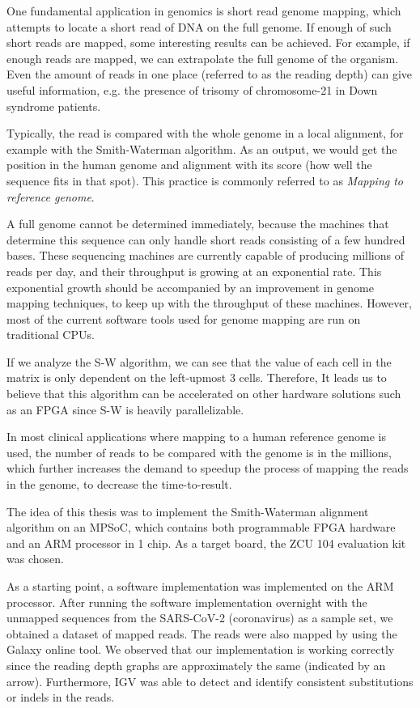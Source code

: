 One fundamental application in genomics is short read genome mapping, which attempts to locate a short read of DNA on the full genome. If enough of such short reads are mapped, some interesting results can be achieved. For example, if enough reads are mapped, we can extrapolate the full genome of the organism. Even the amount of reads in one place (referred to as the reading depth) can give useful information, e.g. the presence of trisomy of chromosome-21 in Down syndrome patients.

Typically, the read is compared with the whole genome in a local alignment, for example with the Smith-Waterman algorithm. As an output, we would get the position in the human genome and alignment with its score (how well the sequence fits in that spot). This practice is commonly referred to as \emph{Mapping to reference genome}.

A full genome cannot be determined immediately, because the machines that determine this sequence can only handle short reads consisting of a few hundred bases. These sequencing machines are currently capable of producing millions of reads per day, and their throughput is growing at an exponential rate. This exponential growth should be accompanied by an improvement in genome mapping techniques, to keep up with the throughput of these machines. However, most of the current software tools used for genome mapping are run on traditional CPUs. 

If we analyze the S-W algorithm, we can see that the value of each cell in the matrix is only dependent on the left-upmost 3 cells. Therefore, It leads us to believe that this algorithm can be accelerated on other hardware solutions such as an FPGA since S-W is heavily parallelizable.

In most clinical applications where mapping to a human reference genome is used, the number of reads to be compared with the genome is in the millions, which further increases the demand to speedup the process of mapping the reads in the genome, to decrease the time-to-result.

The idea of this thesis was to implement the Smith-Waterman alignment algorithm on an MPSoC, which contains both programmable FPGA hardware and an ARM processor in 1 chip. As a target board, the ZCU 104 evaluation kit was chosen.

As a starting point, a software implementation was implemented on the ARM processor. After running the software implementation overnight with the unmapped sequences from the SARS-CoV-2 (coronavirus) as a sample set, we obtained a dataset of mapped reads. The reads were also mapped by using the Galaxy online tool. We observed that our implementation is working correctly since the reading depth graphs are approximately the same (indicated by an arrow). Furthermore, IGV was able to detect and identify consistent substitutions or indels in the reads.

